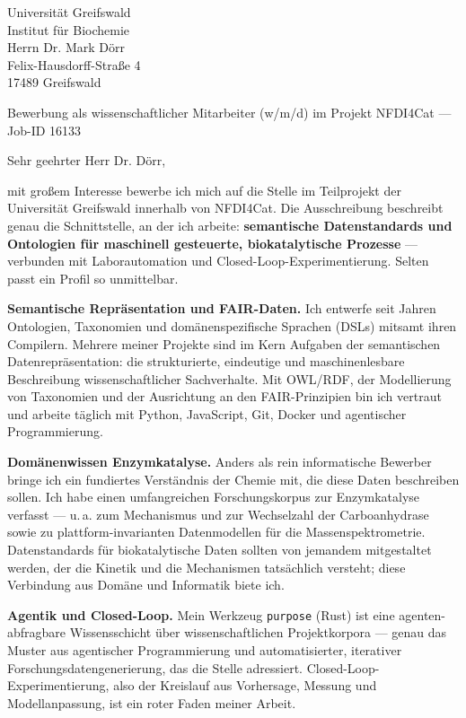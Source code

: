\documentclass[11pt,a4paper]{letter}
\begin{document}
\begin{letter}{%
  Universität Greifswald \\
  Institut für Biochemie \\
  Herrn Dr. Mark Dörr \\
  Felix-Hausdorff-Straße 4 \\
  17489 Greifswald%
}

\opening{Bewerbung als wissenschaftlicher Mitarbeiter (w/m/d) im Projekt NFDI4Cat --- Job-ID 16133}

Sehr geehrter Herr Dr. Dörr,

mit großem Interesse bewerbe ich mich auf die Stelle im Teilprojekt der Universität
Greifswald innerhalb von NFDI4Cat. Die Ausschreibung beschreibt genau die
Schnittstelle, an der ich arbeite: \textbf{semantische Datenstandards und Ontologien
für maschinell gesteuerte, biokatalytische Prozesse} --- verbunden mit Laborautomation
und Closed-Loop-Experimentierung. Selten passt ein Profil so unmittelbar.

\textbf{Semantische Repräsentation und FAIR-Daten.} Ich entwerfe seit Jahren Ontologien,
Taxonomien und domänenspezifische Sprachen (DSLs) mitsamt ihren Compilern. Mehrere
meiner Projekte sind im Kern Aufgaben der semantischen Datenrepräsentation: die
strukturierte, eindeutige und maschinenlesbare Beschreibung wissenschaftlicher
Sachverhalte. Mit OWL/RDF, der Modellierung von Taxonomien und der Ausrichtung an den
FAIR-Prinzipien bin ich vertraut und arbeite täglich mit Python, JavaScript, Git,
Docker und agentischer Programmierung.

\textbf{Domänenwissen Enzymkatalyse.} Anders als rein informatische Bewerber bringe ich
ein fundiertes Verständnis der Chemie mit, die diese Daten beschreiben sollen. Ich habe
einen umfangreichen Forschungskorpus zur Enzymkatalyse verfasst --- u.\,a. zum
Mechanismus und zur Wechselzahl der Carboanhydrase sowie zu plattform-invarianten
Datenmodellen für die Massenspektrometrie. Datenstandards für biokatalytische Daten
sollten von jemandem mitgestaltet werden, der die Kinetik und die Mechanismen
tatsächlich versteht; diese Verbindung aus Domäne und Informatik biete ich.

\textbf{Agentik und Closed-Loop.} Mein Werkzeug \texttt{purpose} (Rust) ist eine
agenten-abfragbare Wissensschicht über wissenschaftlichen Projektkorpora --- genau das
Muster aus agentischer Programmierung und automatisierter, iterativer
Forschungsdatengenerierung, das die Stelle adressiert. Closed-Loop-Experimentierung,
also der Kreislauf aus Vorhersage, Messung und Modellanpassung, ist ein roter Faden
meiner Arbeit.


\end{letter}
\end{document}
